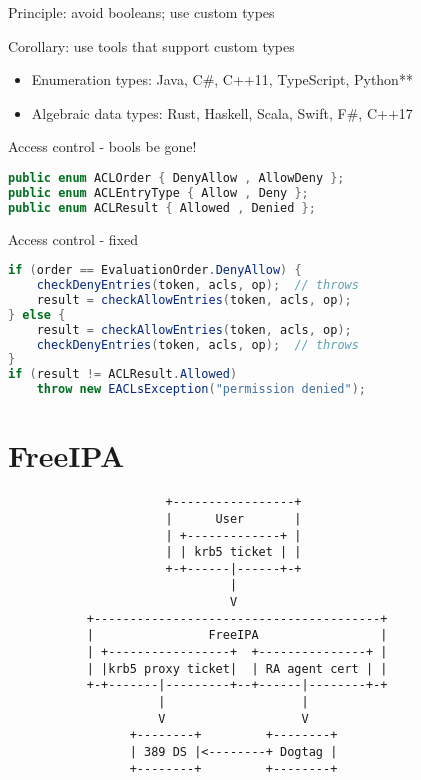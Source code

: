 \documentclass[ignorenonframetext,aspectratio=169,dvipsnames]{beamer}
\begin{document}
\begin{frame}[plain]
\huge Principle: avoid booleans; use custom types
\pause

\Large Corollary: use tools that support custom types
\end{frame}

\begin{frame}[plain]
\Large
\begin{itemize}
    \item Enumeration types: Java, C\#, C++11, TypeScript, Python**
    \item Algebraic data types: Rust, Haskell, Scala, Swift, F\#, C++17
\end{itemize}
\end{frame}



\begin{frame}[fragile]{Access control - bools be gone!}
\begin{lstlisting}[language=Java]
public enum ACLOrder { DenyAllow , AllowDeny };
public enum ACLEntryType { Allow , Deny };
public enum ACLResult { Allowed , Denied };
\end{lstlisting}
\end{frame}

\begin{frame}[fragile]{Access control - fixed}
\begin{lstlisting}[language=Java]
if (order == EvaluationOrder.DenyAllow) {
    checkDenyEntries(token, acls, op);  // throws
    result = checkAllowEntries(token, acls, op);
} else {
    result = checkAllowEntries(token, acls, op);
    checkDenyEntries(token, acls, op);  // throws
}
if (result != ACLResult.Allowed)
    throw new EACLsException("permission denied");
\end{lstlisting}
\end{frame}




\section{FreeIPA}\label{freeipa}

\begin{frame}
\begin{verbatim}
                      +-----------------+
                      |      User       |
                      | +-------------+ |
                      | | krb5 ticket | |
                      +-+------|------+-+
                               |
                               V
           +----------------------------------------+
           |                FreeIPA                 |
           | +-----------------+  +---------------+ |
           | |krb5 proxy ticket|  | RA agent cert | |
           +-+-------|---------+--+------|--------+-+
                     |                   |
                     V                   V
                 +--------+         +--------+
                 | 389 DS |<--------+ Dogtag |
                 +--------+         +--------+
\end{verbatim}
\end{frame}
\end{document}
